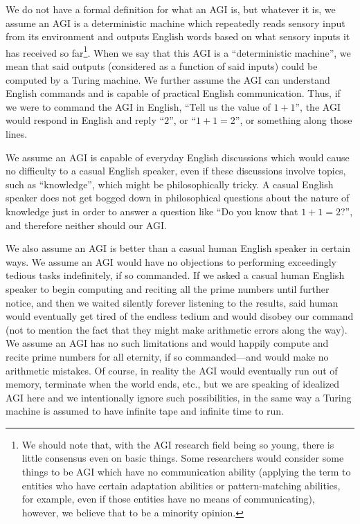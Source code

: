\documentclass[runningheads]{llncs}
\begin{document}
We do not have a formal definition for what an AGI is, but whatever it is,
we assume an AGI is a deterministic machine
which repeatedly reads sensory input from its environment and outputs
English words based on what sensory inputs it has received so
far\footnote{We should note that, with the AGI research field being so young,
there is little consensus even on basic things. Some researchers would
consider some things to be AGI which have no communication ability (applying the
term to entities who have certain adaptation abilities or
pattern-matching abilities, for example, even if those entities have no
means of communicating), however, we believe that to be a minority opinion.}.
When we say that this AGI is a ``deterministic machine'', we mean that
said outputs (considered as a function of said inputs) could be computed
by a Turing machine. We further assume the AGI can understand English
commands and is capable of practical English communication. Thus, if
we were to command the AGI in English, ``Tell us the value of $1+1$'',
the AGI would respond in English and reply ``$2$'', or ``$1+1=2$'',
or something along those lines.

We assume an AGI is capable of everyday English discussions
which would cause no difficulty to a casual English speaker, even if
these discussions involve topics, such as ``knowledge'', which
might be philosophically tricky. A casual English speaker does not get
bogged down in philosophical questions about the nature of knowledge
just in order to answer a question like ``Do you know that $1+1=2$?'',
and therefore neither should our AGI.

We also assume an AGI is better than a casual human English speaker in certain ways.
We assume an AGI would have no objections to performing exceedingly tedious
tasks indefinitely, if so commanded. If we asked a casual human English speaker to
begin computing and reciting all the prime numbers until further notice, and
then we waited silently forever listening to the results, said human would eventually
get tired of the endless tedium and would disobey our command (not to mention
the fact that they might make arithmetic errors along the way). We assume an AGI
has no such limitations and would happily compute and recite prime numbers for
all eternity, if so commanded---and would make no arithmetic mistakes. Of course,
in reality the AGI would eventually run out of memory, terminate when the world ends,
etc., but we are speaking of idealized AGI here and we
intentionally ignore such possibilities, in the same way a Turing machine is
assumed to have infinite tape and infinite time to run.
\end{document}
